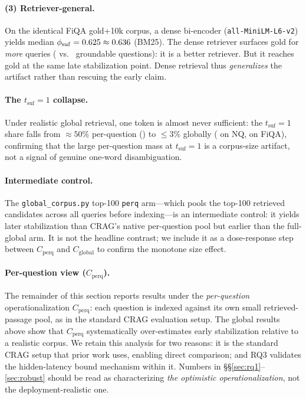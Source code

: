 \paragraph{(3) Retriever-general.} On the identical FiQA gold+10k corpus, a dense
bi-encoder (\texttt{all-MiniLM-L6-v2}) yields
median $\phi_{\mathrm{suf}} = 0.625{} \approx 0.636{}$ (BM25).
The dense retriever surfaces
gold for \emph{more} queries (\nGfiqaDe{} vs.\ \nGfiqaBm{} groundable questions):
it is a better retriever. But it reaches gold at the same late stabilization
point. Dense retrieval thus \emph{generalizes} the artifact rather than rescuing
the early claim.

\paragraph{The $t_{\mathrm{suf}}{=}1$ collapse.} Under realistic global retrieval,
one token is almost never sufficient: the $t_{\mathrm{suf}}{=}1$ share falls from
${\approx}50\%$ per-question (\tSufOneAll{}) to ${\leq}3\%$ globally
(\tSufOneGnqOneM{} on NQ, \tSufOneGfiqaBm{} on FiQA), confirming that the
large per-question mass at $t_{\mathrm{suf}}{=}1$ is a corpus-size artifact, not
a signal of genuine one-word disambiguation.

\paragraph{Intermediate control.} The \texttt{global\_corpus.py} top-100 \texttt{perq}
arm---which pools the top-100 retrieved candidates across all queries before
indexing---is an intermediate control: it yields later stabilization than CRAG's
native per-question pool but earlier than the full-global arm. It is not the
headline contrast; we include it as a dose-response step between
$C_{\mathrm{perq}}$ and $C_{\mathrm{global}}$ to confirm the monotone
size effect.

\paragraph{Per-question view ($C_{\mathrm{perq}}$).}
The remainder of this section reports results under the \emph{per-question}
operationalization $C_{\mathrm{perq}}$: each question is indexed against its own
small retrieved-passage pool, as in the standard CRAG evaluation setup.  The
global results above show that $C_{\mathrm{perq}}$ systematically over-estimates
early stabilization relative to a realistic corpus.  We retain this analysis for
two reasons: it is the standard CRAG setup that prior work uses, enabling direct
comparison; and RQ3 validates the hidden-latency bound mechanism within it.
Numbers in \S\S\ref{sec:rq1}--\ref{sec:robust} should be read as characterizing
\emph{the optimistic operationalization}, not the deployment-realistic one.

